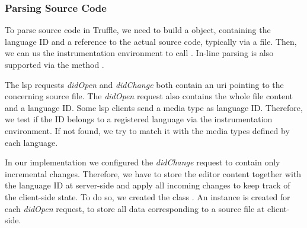 \subsubsection{Parsing Source Code}
    To parse source code in Truffle, we need to build a  object, containing the language ID and a reference to the actual source code, typically via a file. Then, we can us the instrumentation environment to call . In-line parsing is also supported via the method .
    
    The \ac{lsp} requests \emph{didOpen} and \emph{didChange} both contain an \ac{uri} pointing to the concerning source file. The \emph{didOpen} request also contains the whole file content and a language ID. Some \ac{lsp} clients send a media type as language ID. Therefore, we test if the ID belongs to a registered language via the instrumentation environment. If not found, we try to match it with the media types defined by each language.
    
    In our implementation we configured the \emph{didChange} request to contain only incremental changes. Therefore, we have to store the editor content together with the language ID at server-side and apply all incoming changes to keep track of the client-side state. To do so, we created the class . An instance is created for each \emph{didOpen} request, to store all data corresponding to a source file at client-side.


